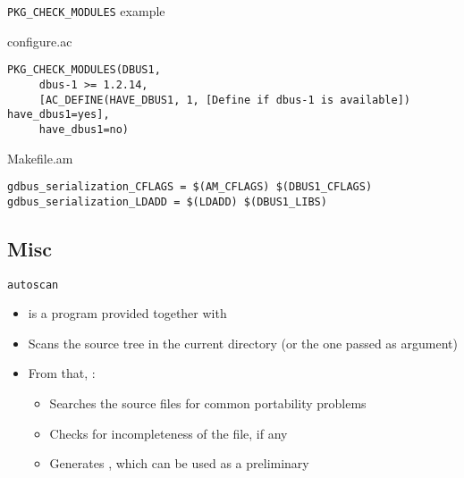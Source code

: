 \begin{frame}[fragile]{{\tt PKG\_CHECK\_MODULES} example}

\begin{block}{configure.ac}
\begin{verbatim}
PKG_CHECK_MODULES(DBUS1,
     dbus-1 >= 1.2.14,
     [AC_DEFINE(HAVE_DBUS1, 1, [Define if dbus-1 is available]) have_dbus1=yes],
     have_dbus1=no)
\end{verbatim}
\end{block}

\begin{block}{Makefile.am}
\begin{verbatim}
gdbus_serialization_CFLAGS = $(AM_CFLAGS) $(DBUS1_CFLAGS)
gdbus_serialization_LDADD = $(LDADD) $(DBUS1_LIBS)
\end{verbatim}
\end{block}

\end{frame}

\subsection{Misc}

\begin{frame}{{\tt autoscan}}
  \begin{itemize}
  \item {} is a program provided together with 
  \item Scans the source tree in the current directory (or the one
    passed as argument)
  \item From that, :
    \begin{itemize}
    \item Searches the source files for common portability problems
    \item Checks for incompleteness of the  file, if any
    \item Generates , which can be used as a
      preliminary 
    \end{itemize}
  \end{itemize}
\end{frame}

